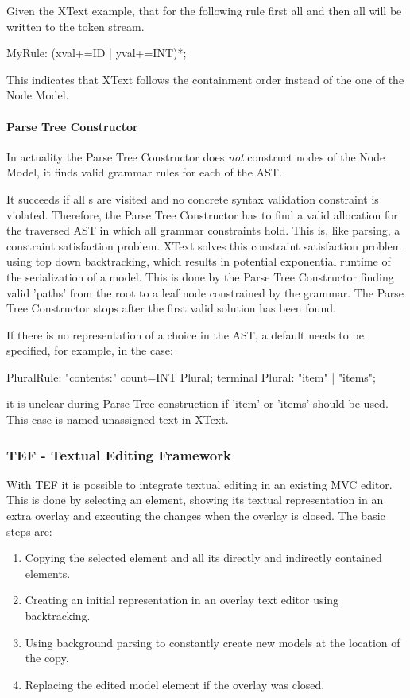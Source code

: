 Given the XText example, that for the following rule first all  and then all  will be written to the token stream.
\begin{xtxt}
MyRule: (xval+=ID | yval+=INT)*; 
\end{xtxt}
This indicates that XText follows the  containment order instead of the one of the Node Model.

\paragraph{Parse Tree Constructor}  \label{xtxt:ptc}
In actuality the Parse Tree Constructor does \emph{not} construct nodes of the Node Model, it finds valid grammar rules for each  of the AST. 

It succeeds if all s are visited and no concrete syntax validation constraint is violated. Therefore, the Parse Tree Constructor has to find a valid allocation for the traversed AST in which all grammar constraints hold.  This is, like parsing, a constraint satisfaction problem. XText solves this constraint satisfaction problem using top down backtracking, which results in potential exponential runtime of the serialization of a model. This is done by the Parse Tree Constructor finding valid 'paths' from the root to a leaf node constrained by the grammar. The Parse Tree Constructor stops after the first valid solution has been found. 

If there is no representation of a choice in the AST, a default needs to be specified, for example, in the case: 
\begin{xtxt}
PluralRule: "contents:" count=INT Plural;
terminal Plural: "item" | "items";
\end{xtxt}
it is unclear during Parse Tree construction if 'item' or 'items' should be used. This case is named unassigned text in XText.



\subsubsection{TEF - Textual Editing Framework}
With TEF it is possible to integrate textual editing in an existing MVC editor. This is done by selecting an element, showing its textual representation in an extra overlay and executing the changes when the overlay is closed. 
The basic steps are:
\begin{enumerate}
	\item Copying the selected element and all its directly and indirectly contained elements.
	\item Creating an initial representation in an overlay text editor using backtracking.
	\item Using background parsing to constantly create new models at the location of the copy.
	\item Replacing the edited model element if the overlay was closed.
\end{enumerate}

